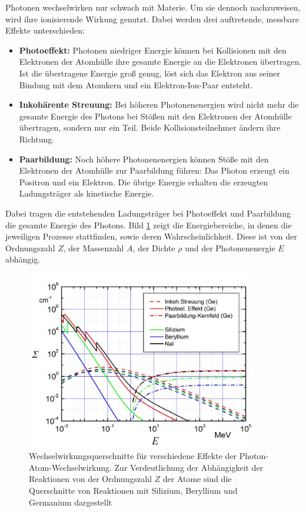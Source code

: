 \documentclass[german, %
parskip=full, %
bibliography=totoc, %
]{scrartcl}
\begin{document}
Photonen wechselwirken nur schwach mit Materie. Um sie dennoch nachzuweisen, wird ihre ionisierende Wirkung genutzt. Dabei werden drei auftretende, messbare Effekte unterschieden:
\begin{itemize}
\item \textbf{Photoeffekt: }Photonen niedriger Energie können bei Kollisionen mit den Elektronen der Atomhülle ihre gesamte Energie an die Elektronen übertragen. Ist die übertragene Energie groß genug, löst sich das Elektron aus seiner Bindung mit dem Atomkern und ein Elektron-Ion-Paar entsteht. 
\item \textbf{Inkohärente Streuung: }Bei höheren Photonenenergien wird nicht mehr die gesamte Energie des Photons bei Stößen mit den Elektronen der Atomhülle übertragen, sondern nur ein Teil. Beide Kollisionsteilnehmer ändern ihre Richtung.
\item \textbf{Paarbildung: }Noch höhere Photonenenergien können Stöße mit den Elektronen der Atomhülle zur Paarbildung führen: Das Photon erzeugt ein Positron und ein Elektron. Die übrige Energie erhalten die erzeugten Ladungsträger als kinetische Energie.
\end{itemize}
Dabei tragen die entstehenden Ladungsträger bei Photoeffekt und Paarbildung die gesamte Energie des Photons. Bild \ref{fig:gammaww} zeigt die Energiebereiche, in denen die jeweiligen Prozesse stattfinden, sowie deren Wahrscheinlichkeit. Diese ist von der Ordnungszahl $Z$, der Massenzahl $A$, der Dichte $\rho$ und der Photonenenergie $E$ abhängig. 

\begin{figure}[ht] 
  \centering
     \includegraphics[width=0.9\textwidth]{gammaww}
  \caption{Wechselwirkungsquerschnitte für verschiedene Effekte der Photon-Atom-Wechselwirkung. Zur Verdeutlichung der Abhängigkeit der Reaktionen von der Ordnungszahl $Z$ der Atome sind die Querschnitte von Reaktionen mit Silizium, Beryllium und Germanium dargestellt}
  \label{fig:gammaww}
\end{figure}
\end{document}
